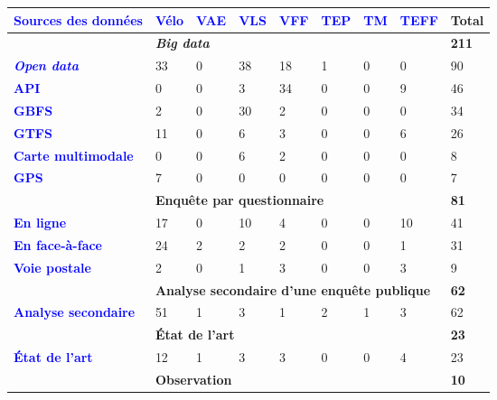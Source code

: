         \begin{table}[h]
        \centering
        \renewcommand{\arraystretch}{1.5}
        \begin{tabular}{p{3.9cm}p{0.83cm}p{0.83cm}p{0.83cm}p{0.83cm}p{0.83cm}p{0.83cm}p{0.83cm}p{0.95cm}}
        \hline
    \rule{0pt}{15pt} \textcolor{blue}{\textbf{Sources des données}} & \textcolor{blue}{\textbf{Vélo}} & \textcolor{blue}{\textbf{VAE}} & \textcolor{blue}{\textbf{VLS}} & \textcolor{blue}{\textbf{VFF}} & \textcolor{blue}{\textbf{TEP}} & \textcolor{blue}{\textbf{TM}} & \textcolor{blue}{\textbf{TEFF}} & \textbf{Total}
    \\
            \hline
        & \multicolumn{7}{l}{\textbf{\textsl{Big data}}} & \textbf{211}\\
        \textcolor{blue}{\textbf{\textsl{Open data}}} & 33 & 0 & 38 & 18 & 1& 0 & 0 & 90\\
        \textcolor{blue}{\textbf{API}} & 0 & 0 & 3 & 34 & 0 & 0 & 9 & 46\\
        \textcolor{blue}{\textbf{GBFS}} & 2 & 0 & 30 & 2 & 0 & 0 & 0 & 34\\
        \textcolor{blue}{\textbf{GTFS}} & 11 & 0 & 6 & 3 & 0 & 0 & 6 & 26\\
        \textcolor{blue}{\textbf{Carte multimodale}} & 0 & 0 & 6 & 2 & 0 & 0 & 0 & 8\\
        \textcolor{blue}{\textbf{GPS}} & 7 & 0 & 0 & 0 & 0 & 0 & 0 & 7\\
            \hline
        & \multicolumn{7}{l}{\textbf{Enquête par questionnaire}} & \textbf{81}\\
        \textcolor{blue}{\textbf{En ligne}} & 17 & 0 & 10 & 4 & 0 & 0 & 10 & 41\\
        \textcolor{blue}{\textbf{En face-à-face}} & 24 & 2 & 2 & 2 & 0 & 0 & 1 & 31\\
        \textcolor{blue}{\textbf{Voie postale}} & 2 & 0 & 1 & 3 & 0 & 0 & 3 & 9\\
            \hline
        & \multicolumn{7}{l}{\textbf{Analyse secondaire d'une enquête publique}} & \textbf{62}\\
        \textcolor{blue}{\textbf{Analyse secondaire}} & 51 & 1 & 3 & 1 & 2 & 1 & 3 & 62\\
            \hline
        & \multicolumn{7}{l}{\textbf{État de l'art}} & \textbf{23}\\
        \textcolor{blue}{\textbf{État de l'art}} & 12 & 1 & 3 & 3 & 0 & 0 & 4 & 23\\
            \hline
        & \multicolumn{7}{l}{\textbf{Observation}} & \textbf{10}\\

\end{tabular}
\end{table}
